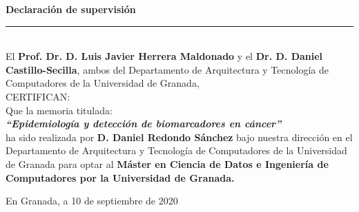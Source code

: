 { \huge \bfseries Declaración de supervisión}\\
  \rule{\linewidth}{0.2 mm} \\[0.5 cm]

El \textbf{Prof. Dr. D. Luis Javier Herrera Maldonado} y el \textbf{Dr. D. Daniel Castillo-Secilla}, ambos del Departamento de Arquitectura y Tecnología de Computadores de la Universidad de Granada,
\\[0,25 cm]
CERTIFICAN:
\\[0,25 cm]
Que la memoria titulada:
\\[0,25 cm]
\textbf{\textit{\large``Epidemiología y detección de biomarcadores en cáncer''}}
\\[0,2 cm]
ha sido realizada por \textbf{D. Daniel Redondo Sánchez} bajo nuestra dirección en el Departamento de Arquitectura y Tecnología de Computadores de la Universidad de Granada para optar al \textbf{Máster en Ciencia de Datos e Ingeniería de Computadores por la Universidad de Granada.}
\\[1 cm]
\begin{center}
    En Granada, a 10 de septiembre de 2020
    \\[2 cm]
    \approval
\end{center}